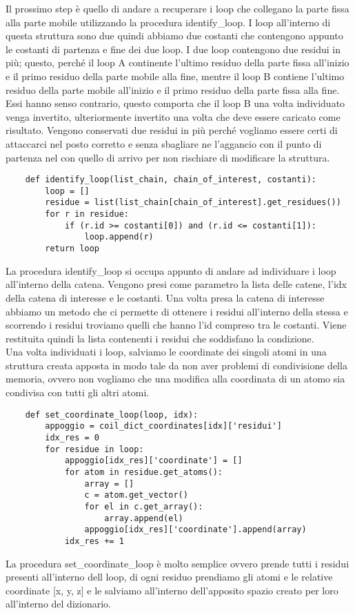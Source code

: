 Il prossimo step è quello di andare a recuperare i loop che collegano la parte fissa alla parte mobile utilizzando la procedura identify\_loop. I loop all'interno di
questa struttura sono due quindi abbiamo due costanti che contengono appunto le costanti di partenza e fine dei due loop. I due loop contengono due residui in più; 
questo, perché il loop A continente l'ultimo residuo della parte fissa all'inizio e il primo residuo della parte mobile alla fine, mentre il loop B contiene 
l'ultimo residuo della parte mobile all'inizio e il primo residuo della parte fissa alla fine. Essi hanno senso contrario, questo comporta che il loop B una volta
individuato venga invertito, ulteriormente invertito una volta che deve essere caricato come risultato. Vengono conservati due residui in più perché vogliamo essere
certi di attaccarci nel posto corretto e senza sbagliare ne l'aggancio con il punto di partenza nel con quello di arrivo per non rischiare di modificare la struttura.

\begin{verbatim}
    def identify_loop(list_chain, chain_of_interest, costanti):
        loop = []
        residue = list(list_chain[chain_of_interest].get_residues())
        for r in residue:
            if (r.id >= costanti[0]) and (r.id <= costanti[1]):
                loop.append(r)  
        return loop
\end{verbatim}
La procedura identify\_loop si occupa appunto di andare ad individuare i loop all'interno della catena. Vengono presi come parametro la lista delle catene, l'idx della
catena di interesse e le costanti. Una volta presa la catena di interesse abbiamo un metodo che ci permette di ottenere i residui all'interno della stessa e scorrendo 
i residui troviamo quelli che hanno l'id compreso tra le costanti. Viene restituita quindi la lista contenenti i residui che soddisfano la condizione.
\\
Una volta individuati i loop, salviamo le coordinate dei singoli atomi in una struttura creata apposta in modo tale da non aver problemi di condivisione della memoria,
ovvero non vogliamo che una modifica alla coordinata di un atomo sia condivisa con tutti gli altri atomi. 
\begin{verbatim}
    def set_coordinate_loop(loop, idx):
        appoggio = coil_dict_coordinates[idx]['residui']
        idx_res = 0
        for residue in loop:
            appoggio[idx_res]['coordinate'] = []
            for atom in residue.get_atoms():
                array = []
                c = atom.get_vector()
                for el in c.get_array():
                    array.append(el)
                appoggio[idx_res]['coordinate'].append(array)
            idx_res += 1
\end{verbatim}
La procedura set\_coordinate\_loop è molto semplice ovvero prende tutti i residui presenti all'interno dell loop, di ogni residuo prendiamo gli atomi e le relative 
coordinate [x, y, z] e le salviamo all'interno dell'apposito spazio creato per loro all'interno del dizionario.



